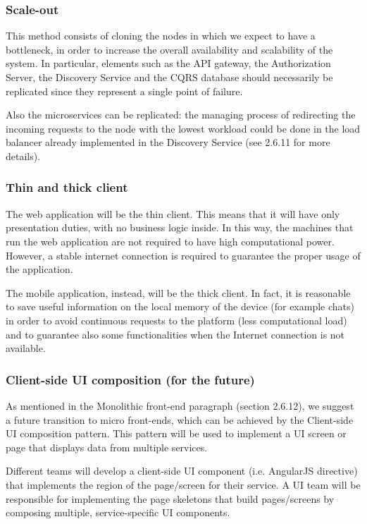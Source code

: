 
\subsubsection{Scale-out}
This method consists of cloning the nodes in which we expect to have a bottleneck, in order to increase the overall availability and scalability of the system. In particular, elements such as the API gateway, the Authorization Server, the Discovery Service and the CQRS database should necessarily be replicated since they represent a single point of failure.

Also the microservices can be replicated: the managing process of redirecting the incoming requests to the node with the lowest workload could be done in the load balancer already implemented in the Discovery Service (see 2.6.11 for more details).

\subsubsection{Thin and thick client}
The web application will be the thin client. This means that it will have only presentation duties, with no business logic inside. In this way, the machines that run the web application are not required to have high computational power. However, a stable internet connection is required to guarantee the proper usage of the application.

The mobile application, instead, will be the thick client. In fact, it is reasonable to save useful information on the local memory of the device (for example chats) in order to avoid continuous requests to the platform (less computational load) and to guarantee also some functionalities when the Internet connection is not available.

\subsubsection{Client-side UI composition (for the future)}
As mentioned in the Monolithic front-end paragraph (section 2.6.12), we suggest a future transition to micro front-ends, which can be achieved by the Client-side UI composition pattern. This pattern will be used to implement a UI screen or page that displays data from multiple services. 

Different teams will develop a client-side UI component (i.e. AngularJS directive) that implements the region of the page/screen for their service. A UI team will be responsible for implementing the page skeletons that build pages/screens by composing multiple, service-specific UI components.

